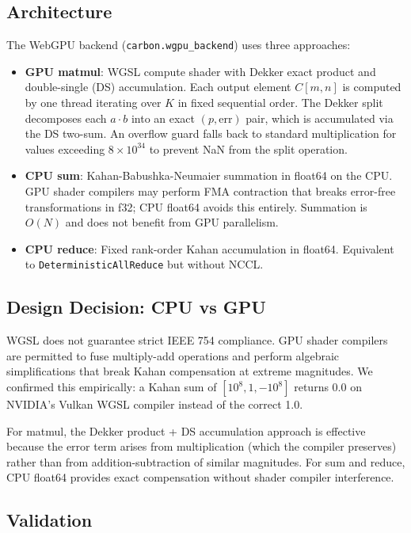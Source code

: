 \documentclass[11pt,a4paper]{article}
\begin{document}
\subsection{Architecture}

The WebGPU backend (\texttt{carbon.wgpu\_backend}) uses three approaches:

\begin{itemize}
  \item \textbf{GPU matmul}: WGSL compute shader with Dekker exact product
    and double-single (DS) accumulation. Each output element $C[m,n]$ is
    computed by one thread iterating over $K$ in fixed sequential order.
    The Dekker split decomposes each $a \cdot b$ into an exact $(p, \text{err})$
    pair, which is accumulated via the DS two-sum. An overflow guard falls back
    to standard multiplication for values exceeding $8 \times 10^{34}$ to
    prevent NaN from the split operation.
  \item \textbf{CPU sum}: Kahan-Babushka-Neumaier summation in float64 on the
    CPU. GPU shader compilers may perform FMA contraction that breaks
    error-free transformations in f32; CPU float64 avoids this entirely.
    Summation is $O(N)$ and does not benefit from GPU parallelism.
  \item \textbf{CPU reduce}: Fixed rank-order Kahan accumulation in float64.
    Equivalent to \texttt{DeterministicAllReduce} but without NCCL.
\end{itemize}

\subsection{Design Decision: CPU vs GPU}

WGSL does not guarantee strict IEEE 754 compliance. GPU shader compilers are
permitted to fuse multiply-add operations and perform algebraic simplifications
that break Kahan compensation at extreme magnitudes. We confirmed this
empirically: a Kahan sum of $[10^8, 1, -10^8]$ returns 0.0 on NVIDIA's Vulkan
WGSL compiler instead of the correct 1.0.

For matmul, the Dekker product + DS accumulation approach is effective because
the error term arises from multiplication (which the compiler preserves) rather
than from addition-subtraction of similar magnitudes. For sum and reduce, CPU
float64 provides exact compensation without shader compiler interference.

\subsection{Validation}
\end{document}
